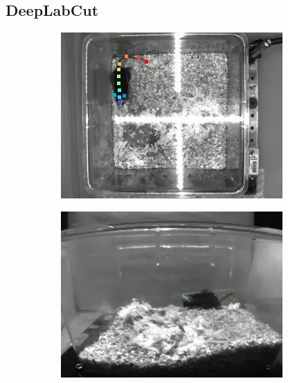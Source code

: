 \subsection{DeepLabCut}\label{sec:DeepLabCut}

\begin{figure}[]
  \centering
  \begin{subfigure}{0.45\textwidth}
    \centering
    \includegraphics[width=\textwidth, angle=-90]{figures/deeplabcut-top-example-4128-2020-12-02-1-00-37.jpg}
    \caption{}
    \label{fig:deeplabcut-top-example}
  \end{subfigure}
  \begin{subfigure}{0.45\textwidth}
    \centering
    \includegraphics[width=\textwidth]{figures/deeplabcut-lateral-example-4128-2020-12-02-1-00-37.jpg}

\end{subfigure}
\end{figure}
